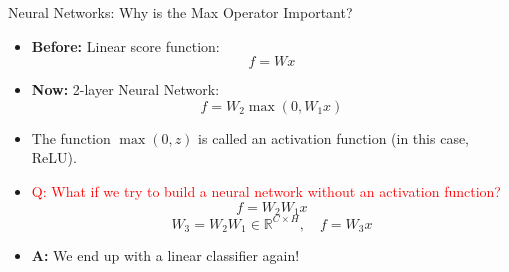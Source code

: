 \documentclass[serif, aspectratio=169]{beamer}
\begin{document}
\begin{frame}{Neural Networks: Why is the Max Operator Important?}
  \begin{itemize}
      \item \textbf{Before:} Linear score function:
      \[
      f = Wx
      \]
      \item \textbf{Now:} 2-layer Neural Network:
      \[
      f = W_2 \max(0, W_1 x)
      \]
      \item The function \(\max(0, z)\) is called an activation function (in this case, ReLU).
      \item \textcolor{red}{Q: What if we try to build a neural network without an activation function?}
      \[
      f = W_2 W_1 x
      \]
      \[
      W_3 = W_2 W_1 \in \mathbb{R}^{C \times H}, \quad f = W_3 x
      \]
      \item \textbf{A:} We end up with a linear classifier again!
  \end{itemize}
\end{frame}
\end{document}
